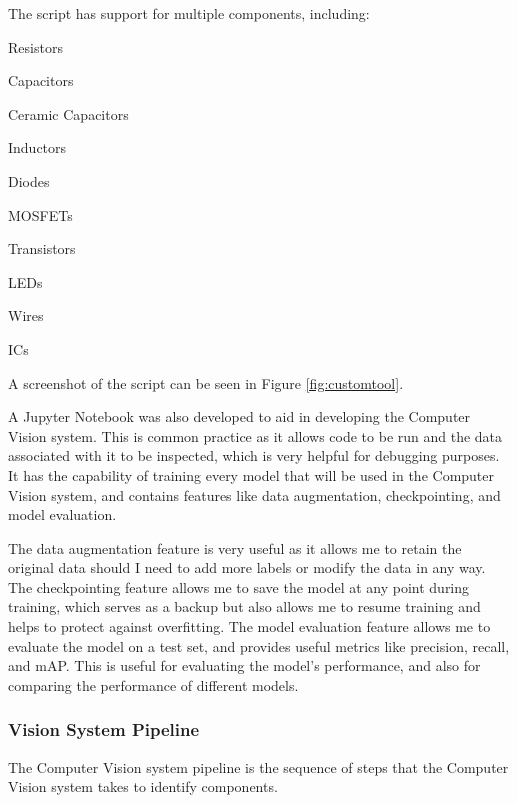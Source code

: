 The script has support for multiple components, including:
\begin{multicols}{2}
    \begin{mylist}
        \item Resistors
        \item Capacitors
        \item Ceramic Capacitors
        \item Inductors
        \item Diodes
        \item MOSFETs
        \item Transistors
        \item LEDs
        \item Wires
        \item ICs
    \end{mylist}
\end{multicols}

A screenshot of the script can be seen in Figure \ref*{fig:customtool}.

A Jupyter Notebook\cite{jupyter} was also developed to aid in developing the Computer Vision system. This is common practice as it
allows code to be run and the data associated with it to be inspected, which is very helpful for debugging purposes. It 
has the capability of training every model that will be used in the Computer Vision system, and contains features like
data augmentation, checkpointing, and model evaluation.

The data augmentation feature is very useful as it allows me to 
retain the original data should I need to add more labels or modify the data in any way. The checkpointing feature allows
me to save the model at any point during training, which serves as a backup but also allows me to resume training and helps 
to protect against overfitting. The model evaluation feature allows me to evaluate the model on a test set, and provides
useful metrics like precision, recall, and mAP. This is useful for evaluating the model's performance, and also for
comparing the performance of different models.

\subsubsection{Vision System Pipeline}
The Computer Vision system pipeline is the sequence of steps that the Computer Vision system takes to identify components.

